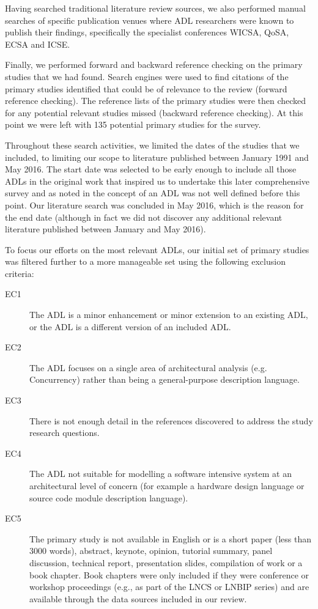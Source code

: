 Having searched traditional literature review sources, we also performed manual searches of specific publication venues where ADL researchers were known to publish their findings, specifically the specialist conferences WICSA, QoSA, ECSA and ICSE.

Finally, we performed forward and backward reference checking on the primary studies that we had found. Search engines were used to find citations of the primary studies identified that could be of relevance to the review (forward reference checking). The reference lists of the primary studies were then checked for any potential relevant studies missed (backward reference checking). At this point we were left with 135 potential primary studies for the survey.

Throughout these search activities, we limited the dates of the studies that we included, to limiting our scope to literature published between January 1991 and May 2016. The start date was selected to be early enough to include all those ADLs in the original work \cite{medvidovic2000-adlcomparison} that inspired us to undertake this later comprehensive survey and as noted in \cite{malavolta2013-industryadlneeds} the concept of an ADL was not well defined before this point.  Our literature search was concluded in May 2016, which is the reason for the end date (although in fact we did not discover any additional relevant literature published between January and May 2016).

To focus our efforts on the most relevant ADLs, our initial set of primary studies was filtered further to a more manageable set using the following exclusion criteria:

\begin{description}
\item[EC1] The ADL is a minor enhancement or minor extension to an existing ADL, or the ADL is a different version of an included ADL.
\item[EC2] The ADL focuses on a single area of architectural analysis (e.g. Concurrency) rather than being a general-purpose description language.
\item[EC3] There is not enough detail in the references discovered to address the study research questions.
\item[EC4] The ADL not suitable for modelling a software intensive system at an architectural level of concern (for example a hardware design language or source code module description language).
\item[EC5] The primary study is not available in English or is a short paper (less than 3000 words), abstract, keynote, opinion, tutorial summary, panel discussion, technical report, presentation slides, compilation of work or a book chapter. Book chapters were only included if they were conference or workshop proceedings (e.g., as part of the LNCS or LNBIP series) and are available through the data sources included in our review. 
\end{description}

